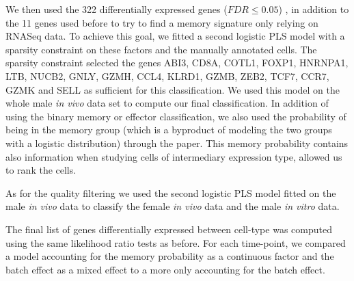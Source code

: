 \documentclass[a4paper,12pt]{article}
\begin{document}
We then used the 322 differentially expressed genes ($FDR \leq 0.05$) \cite{benjaminiControllingFalseDiscovery1995}, in addition to the 11 genes used before to try to find a memory signature only relying on RNASeq data.
To achieve this goal, we fitted a second logistic PLS model with a sparsity constraint on these factors and the manually annotated cells.
The sparsity constraint selected the genes ABI3, CD8A, COTL1, FOXP1, HNRNPA1, LTB, NUCB2, GNLY, GZMH, CCL4, KLRD1, GZMB, ZEB2, TCF7, CCR7, GZMK and SELL as sufficient for this classification.
We used this model on the whole male {\it in vivo} data set to compute our final classification.
In addition of using the binary memory or effector classification, we also used the probability of being in the memory group (which is a byproduct of modeling the two groups with a logistic distribution) through the paper.
This memory probability contains also information when studying cells of intermediary expression type, allowed us to rank the cells.

As for the quality filtering we used the second logistic PLS model fitted on the male {\it in vivo} data to classify the female {\it in vivo} data and the male {\it in vitro} data.

The final list of genes differentially expressed between cell-type was computed using the same likelihood ratio tests as before.
For each time-point, we compared a model accounting for the memory probability as a continuous factor and the batch effect as a mixed effect to a more only accounting for the batch effect.



\end{document}
